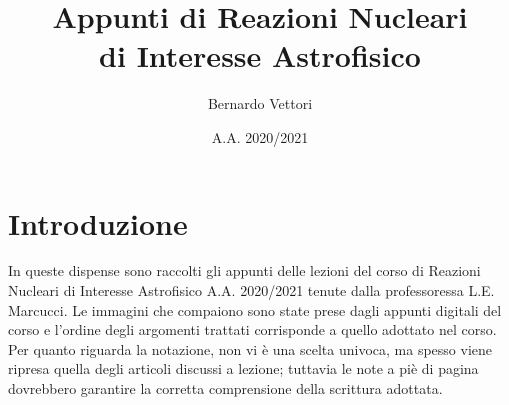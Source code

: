 \documentclass[12pt,a4paper,titlepage,openany]{book}
\title{Appunti di Reazioni Nucleari\\di Interesse Astrofisico}
\author{Bernardo Vettori}
\date{A.A. 2020/2021}
\newcommand\blankpage{
    \null
    \thispagestyle{empty}
    \addtocounter{page}{-1}
    \newpage
    }
\begin{document}
\frontmatter
\maketitle
\chapter*{Introduzione}
\noindent In queste dispense sono raccolti gli appunti delle lezioni del corso di Reazioni Nucleari di Interesse Astrofisico A.A. 2020/2021 tenute dalla professoressa L.E. Marcucci. Le immagini che compaiono sono state prese dagli appunti digitali del corso e l'ordine degli argomenti trattati corrisponde a quello adottato nel corso.\\
Per quanto riguarda la notazione, non vi è una scelta univoca, ma spesso viene ripresa quella degli articoli discussi a lezione; tuttavia le note a piè di pagina dovrebbero garantire la corretta comprensione della scrittura adottata.
\newpage
\tableofcontents
\mainmatter




\afterpage{\blankpage}
\printindex
\listoffigures{}
\end{document}
